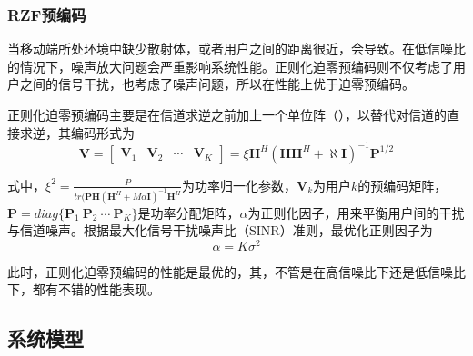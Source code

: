 \subsubsection{RZF预编码}
当移动端所处环境中缺少散射体，或者用户之间的距离很近，会导致{\color{yellow}{信道矩阵会因为高度的相关性而成为病态矩阵（欠秩），因而产生噪声放大问题}}。在低信噪比的情况下，噪声放大问题会严重影响系统性能。正则化迫零预编码则不仅考虑了用户之间的信号干扰，也考虑了噪声问题，所以在性能上优于迫零预编码。\par 
正则化迫零预编码主要是在信道求逆之前加上一个单位阵（{\color{yellow}{此单位阵的作用即为减弱信道矩阵的相关性，避免求逆时产生噪声放大问题}}），以替代对信道的直接求逆，其编码形式为
\begin{equation}
    \bm{V}=\begin{bmatrix}
        \bm{V}_1 & \bm{V}_2 & \cdots & \bm{V}_K
    \end{bmatrix}=\xi\bm{H}^H(\bm{HH}^H+\aleph\bm{I})^{-1}\bm{P}^{1/2}
\end{equation}\par 
式中，$\xi^2=\frac{P}{tr(\bm{PH}(\bm{H}^H+M\alpha \bm{I})^{-1}\bm{H}^H}$为功率归一化参数，$\bm{V}_k$为用户$k$的预编码矩阵，$\bm{P}=diag\{\bm{P}_1\ \bm{P}_2\ \cdots \ \bm{P}_K\}$是功率分配矩阵，$\alpha$为正则化因子，用来平衡用户间的干扰与信道噪声。根据最大化信号干扰噪声比（SINR）准则，最优化正则因子为
\begin{equation}
    \alpha = K\sigma^2
\end{equation}\par 
此时，正则化迫零预编码的性能是最优的，其{\color{yellow}{既考虑了多用户接收信号之间干扰，又考虑了噪声因素的影响}}，不管是在高信噪比下还是低信噪比下，都有不错的性能表现。
\subsection{系统模型}

